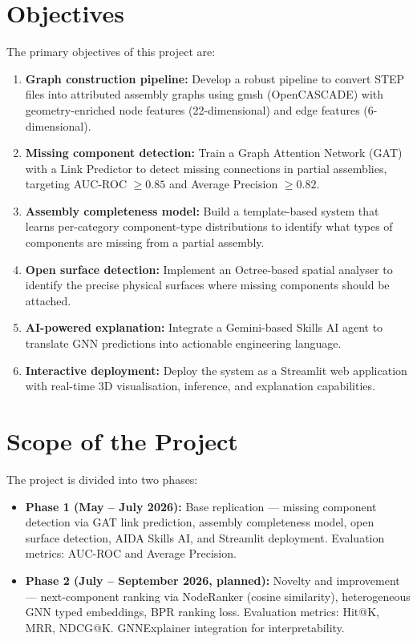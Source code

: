 \documentclass[12pt]{report}
\begin{document}
\section{Objectives}

The primary objectives of this project are:

\begin{enumerate}[label=\arabic*.]
    \item \textbf{Graph construction pipeline:} Develop a robust pipeline to convert STEP files into attributed assembly graphs using gmsh (OpenCASCADE) with geometry-enriched node features (22-dimensional) and edge features (6-dimensional).
    \item \textbf{Missing component detection:} Train a Graph Attention Network (GAT) with a Link Predictor to detect missing connections in partial assemblies, targeting AUC-ROC $\geq 0.85$ and Average Precision $\geq 0.82$.
    \item \textbf{Assembly completeness model:} Build a template-based system that learns per-category component-type distributions to identify what types of components are missing from a partial assembly.
    \item \textbf{Open surface detection:} Implement an Octree-based spatial analyser to identify the precise physical surfaces where missing components should be attached.
    \item \textbf{AI-powered explanation:} Integrate a Gemini-based Skills AI agent to translate GNN predictions into actionable engineering language.
    \item \textbf{Interactive deployment:} Deploy the system as a Streamlit web application with real-time 3D visualisation, inference, and explanation capabilities.
\end{enumerate}

\section{Scope of the Project}

The project is divided into two phases:

\begin{itemize}
    \item \textbf{Phase 1 (May -- July 2026):} Base replication --- missing component detection via GAT link prediction, assembly completeness model, open surface detection, AIDA Skills AI, and Streamlit deployment. Evaluation metrics: AUC-ROC and Average Precision.
    \item \textbf{Phase 2 (July -- September 2026, planned):} Novelty and improvement --- next-component ranking via NodeRanker (cosine similarity), heterogeneous GNN typed embeddings, BPR ranking loss. Evaluation metrics: Hit@K, MRR, NDCG@K. GNNExplainer integration for interpretability.
\end{itemize}
\end{document}
